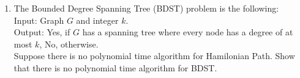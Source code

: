 \documentclass[12pt]{article}
\begin{document}
\begin{enumerate}
\item The Bounded Degree Spanning Tree (BDST) problem is the following:\\
    Input: Graph $G$ and integer $k$.\\
    Output: Yes, if $G$ has a spanning tree where every node has a degree of at
    most $k$, No, otherwise.\\
    Suppose there is no polynomial time algorithm for Hamilonian Path. Show that
    there is no polynomial time algorithm for BDST.

\end{enumerate}
\end{document}
